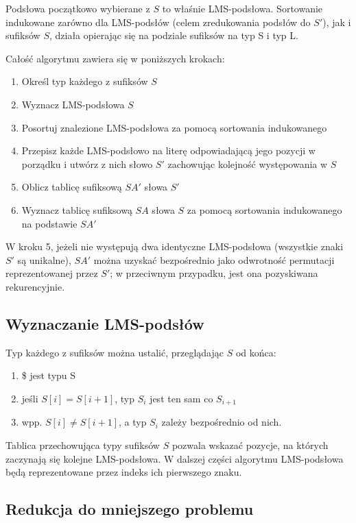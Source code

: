 \documentclass[12pt]{article}
\begin{document}
Podsłowa początkowo wybierane z $S$ to właśnie LMS-podsłowa. Sortowanie indukowane
zarówno dla LMS-podsłów (celem zredukowania podsłów do $S'$), jak i sufiksów $S$,
działa opierając się na podziale sufiksów na typ S i typ L.

Całość algorytmu zawiera się w poniższych krokach:

\begin{enumerate}
	\item Określ typ każdego z sufiksów $S$
	\item Wyznacz LMS-podsłowa $S$
	\item Posortuj znalezione LMS-podsłowa za pomocą sortowania indukowanego
	\item Przepisz każde LMS-podsłowo na literę odpowiadającą jego pozycji
		w porządku i utwórz z nich słowo $S'$ zachowując kolejność występowania
		w $S$
	\item Oblicz tablicę sufiksową $SA'$ słowa $S'$
	\item Wyznacz tablicę sufiksową $SA$ słowa $S$ za pomocą sortowania
		indukowanego na podstawie $SA'$
\end{enumerate}

W kroku 5, jeżeli nie występują dwa identyczne LMS-podsłowa (wszystkie znaki
$S'$ są unikalne), $SA'$ można uzyskać bezpośrednio jako odwrotność permutacji
reprezentowanej przez $S'$; w przeciwnym przypadku, jest ona pozyskiwana
rekurencyjnie.

\subsection*{Wyznaczanie LMS-podsłów}

Typ każdego z sufiksów można ustalić, przeglądając $S$ od końca:

\begin{enumerate}
	\item \$ jest typu S
	\item jeśli $S[i] = S[i+1]$, typ $S_i$ jest ten sam co $S_{i+1}$
	\item wpp. $S[i] \neq S[i+1]$, a typ $S_i$ zależy bezpośrednio od nich.
\end{enumerate}

Tablica przechowująca typy sufiksów $S$ pozwala wskazać pozycje, na których
zaczynają się kolejne LMS-podsłowa. W dalszej części algorytmu LMS-podsłowa
będą reprezentowane przez indeks ich pierwszego znaku.

\subsection*{Redukcja do mniejszego problemu}
\end{document}
